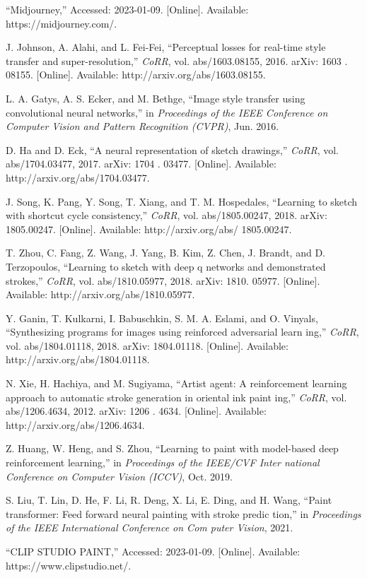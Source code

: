\documentclass{mva_style}
\begin{document}
\begin{thebibliography}{99}

“Midjourney,” Accessed: 2023-01-09. [Online]. Available: https://midjourney.com/.

\sloppy
J. Johnson, A. Alahi, and L. Fei-Fei, “Perceptual losses for real-time
style transfer and super-resolution,” \textit{CoRR}, vol. abs/1603.08155, 2016.
arXiv: 1603 . 08155. [Online]. Available: http://arxiv.org/abs/1603.08155.

L. A. Gatys, A. S. Ecker, and M. Bethge, “Image style transfer using
convolutional neural networks,” in \textit{Proceedings of the IEEE Conference
on Computer Vision and Pattern Recognition (CVPR)}, Jun. 2016.

\sloppy
D. Ha and D. Eck, “A neural representation of sketch drawings,” \textit{CoRR},
vol. abs/1704.03477, 2017. arXiv: 1704 . 03477. [Online]. Available:
http://arxiv.org/abs/1704.03477.

J. Song, K. Pang, Y. Song, T. Xiang, and T. M. Hospedales, “Learning
to sketch with shortcut cycle consistency,” \textit{CoRR}, vol. abs/1805.00247,
2018. arXiv: 1805.00247. [Online]. Available: http://arxiv.org/abs/
1805.00247.

T. Zhou, C. Fang, Z. Wang, J. Yang, B. Kim, Z. Chen, J. Brandt,
and D. Terzopoulos, “Learning to sketch with deep q networks and
demonstrated strokes,” \textit{CoRR}, vol. abs/1810.05977, 2018. arXiv: 1810.
05977. [Online]. Available: http://arxiv.org/abs/1810.05977.

Y. Ganin, T. Kulkarni, I. Babuschkin, S. M. A. Eslami, and O. Vinyals,
“Synthesizing programs for images using reinforced adversarial learn
ing,” \textit{CoRR}, vol. abs/1804.01118, 2018. arXiv: 1804.01118. [Online].
Available: http://arxiv.org/abs/1804.01118.

N. Xie, H. Hachiya, and M. Sugiyama, “Artist agent: A reinforcement
learning approach to automatic stroke generation in oriental ink paint
ing,” \textit{CoRR}, vol. abs/1206.4634, 2012. arXiv: 1206 . 4634. [Online].
Available: http://arxiv.org/abs/1206.4634.

Z. Huang, W. Heng, and S. Zhou, “Learning to paint with model-based
deep reinforcement learning,” in \textit{Proceedings of the IEEE/CVF Inter
national Conference on Computer Vision (ICCV)}, Oct. 2019.

S. Liu, T. Lin, D. He, F. Li, R. Deng, X. Li, E. Ding, and H. Wang,
“Paint transformer: Feed forward neural painting with stroke predic
tion,” in \textit{Proceedings of the IEEE International Conference on Com
puter Vision}, 2021.


“CLIP STUDIO PAINT,” Accessed: 2023-01-09. [Online]. Available: https://www.clipstudio.net/.

\end{thebibliography}
\end{document}
